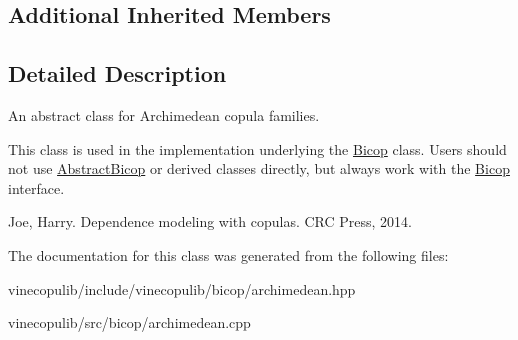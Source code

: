 \subsection*{Additional Inherited Members}


\subsection{Detailed Description}
An abstract class for Archimedean copula families. 

This class is used in the implementation underlying the \hyperlink{classvinecopulib_1_1_bicop}{Bicop} class. Users should not use \hyperlink{classvinecopulib_1_1_abstract_bicop}{Abstract\+Bicop} or derived classes directly, but always work with the \hyperlink{classvinecopulib_1_1_bicop}{Bicop} interface.

Joe, Harry. Dependence modeling with copulas. C\+R\+C Press, 2014. 

The documentation for this class was generated from the following files\+:\begin{DoxyCompactItemize}
\item 
vinecopulib/include/vinecopulib/bicop/archimedean.\+hpp\item 
vinecopulib/src/bicop/archimedean.\+cpp\end{DoxyCompactItemize}
